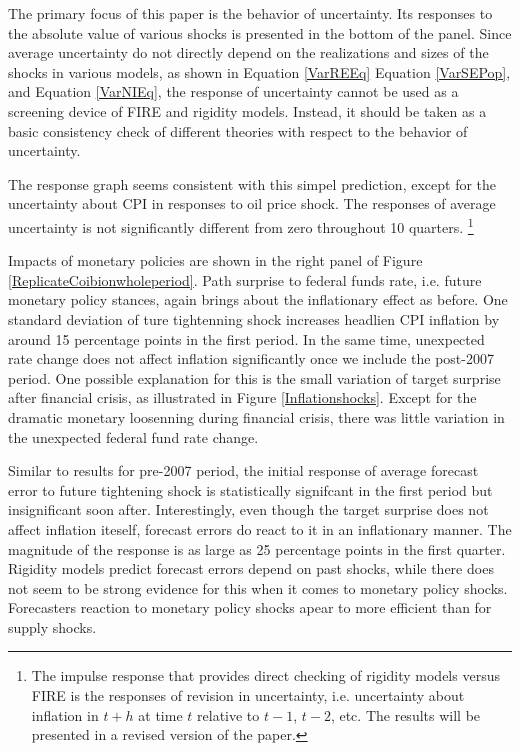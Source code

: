 \documentclass[]{article}
\begin{document}
The primary focus of this paper is the behavior of uncertainty. Its responses to the absolute value of various shocks is presented in the bottom of the panel. Since  average uncertainty do not directly depend on the realizations and sizes of the shocks in various models, as shown in Equation \ref{VarREEq}  Equation \ref{VarSEPop}, and Equation \ref{VarNIEq}, the response of uncertainty cannot be used as a screening device of  FIRE and rigidity models. Instead, it should be taken as a basic consistency check of different theories with respect to the behavior of uncertainty.  

 The response graph seems consistent with this simpel prediction, except for the uncertainty about CPI in responses to oil price shock. The responses of average uncertainty is not significantly different from zero throughout 10 quarters. \footnote{The impulse response that provides direct checking of rigidity models versus FIRE is the responses of revision in uncertainty, i.e. uncertainty about inflation in $t+h$ at time $t$ relative to $t-1$, $t-2$, etc. The results will be presented in a revised version of the paper.} 
 
Impacts of monetary policies are shown in the right panel of Figure \ref{ReplicateCoibionwholeperiod}. Path surprise to federal funds rate, i.e. future monetary policy stances, again brings about the inflationary effect as before. One standard deviation of ture tightenning shock increases headlien CPI inflation by around 15 percentage points in the first period.  In the same time, unexpected rate change does not affect inflation significantly once we include the post-2007 period.  One possible explanation for this is the small variation of target surprise after financial crisis, as illustrated in Figure \ref{Inflationshocks}. Except for the dramatic monetary loosenning during financial crisis, there was little variation in the unexpected federal fund rate change.  

Similar to results for pre-2007 period, the initial response of average forecast error to future tightening shock is statistically signifcant in the first period but insignificant soon after.  Interestingly, even though the target surprise does not affect inflation iteself, forecast errors do react to it in an inflationary manner. The magnitude of the response is as large as 25 percentage points in the first quarter. Rigidity models predict forecast errors depend on past shocks, while there does not seem to be strong evidence for this when it comes to monetary policy shocks. Forecasters reaction to monetary policy shocks apear to more efficient than for supply shocks. 
\end{document}
